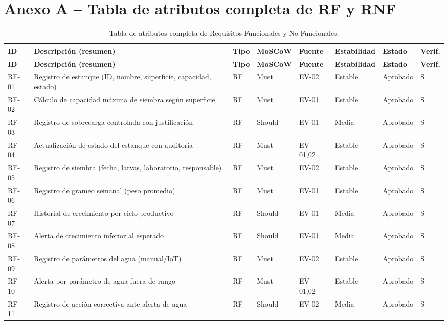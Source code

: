 \documentclass[11pt,a4paper]{report}
\begin{document}
\section*{Anexo A -- Tabla de atributos completa de RF y RNF}
{\footnotesize
\begin{longtable}{L{1.1cm}L{4.6cm}L{1.0cm}L{1.3cm}L{1.3cm}L{1.3cm}L{1.4cm}L{1.1cm}}
\caption{Tabla de atributos completa de Requisitos Funcionales y No Funcionales.}\label{tab:atributos}\\
\toprule
\textbf{ID} & \textbf{Descripci\'on (resumen)} & \textbf{Tipo} & \textbf{MoSCoW} & \textbf{Fuente} & \textbf{Estabilidad} & \textbf{Estado} & \textbf{Verif.} \\
\midrule
\endfirsthead
\toprule
\textbf{ID} & \textbf{Descripci\'on (resumen)} & \textbf{Tipo} & \textbf{MoSCoW} & \textbf{Fuente} & \textbf{Estabilidad} & \textbf{Estado} & \textbf{Verif.} \\
\midrule
\endhead
\bottomrule
\endfoot
RF-01 & Registro de estanque (ID, nombre, superficie, capacidad, estado) & RF & Must & EV-02 & Estable & Aprobado & S \\
RF-02 & C\'alculo de capacidad m\'axima de siembra seg\'un superficie & RF & Must & EV-01 & Estable & Aprobado & S \\
RF-03 & Registro de sobrecarga controlada con justificaci\'on & RF & Should & EV-01 & Media & Aprobado & S \\
RF-04 & Actualizaci\'on de estado del estanque con auditor\'ia & RF & Must & EV-01,02 & Estable & Aprobado & S \\
RF-05 & Registro de siembra (fecha, larvas, laboratorio, responsable) & RF & Must & EV-02 & Estable & Aprobado & S \\
RF-06 & Registro de grameo semanal (peso promedio) & RF & Must & EV-01 & Estable & Aprobado & S \\
RF-07 & Historial de crecimiento por ciclo productivo & RF & Should & EV-01 & Media & Aprobado & S \\
RF-08 & Alerta de crecimiento inferior al esperado & RF & Should & EV-01 & Media & Aprobado & S \\
RF-09 & Registro de par\'ametros del agua (manual/IoT) & RF & Must & EV-02 & Estable & Aprobado & S \\
RF-10 & Alerta por par\'ametro de agua fuera de rango & RF & Must & EV-01,02 & Estable & Aprobado & S \\
RF-11 & Registro de acci\'on correctiva ante alerta de agua & RF & Should & EV-02 & Media & Aprobado & S \\

\end{longtable}}
\end{document}
